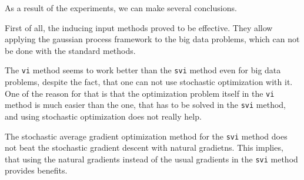 As a result of the experiments, we can make several conclusions.

First of all, the inducing input methods proved to be effective. They allow applying the gaussian process framework to the big data problems, which can not be done with the standard methods. 

The \lstinline{vi} method seems to work better than the \lstinline{svi} method even for big data problems, despite the fact, that one can not use stochastic optimization with it. One of the reason for that is that the optimization problem itself in the \lstinline{vi} method is much easier than the one, that has to be solved in the \lstinline{svi} method, and using stochastic optimization does not really help.

The stochastic average gradient optimization method for the \lstinline{svi} method does not beat the stochastic gradient descent with natural gradietns. This implies, that using the natural gradients instead of the usual gradients in the \lstinline{svi} method provides benefits.